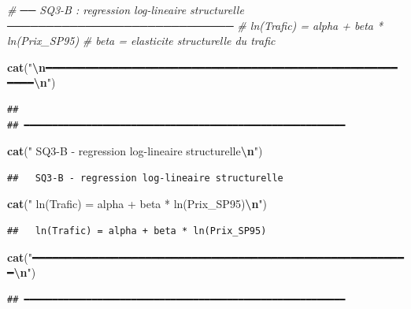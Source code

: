 \documentclass[
]{article}
\newenvironment{Shaded}{\begin{snugshade}}{\end{snugshade}}
\newcommand{\CommentTok}[1]{\textcolor[rgb]{0.56,0.35,0.01}{\textit{#1}}}
\newcommand{\FunctionTok}[1]{\textcolor[rgb]{0.13,0.29,0.53}{\textbf{#1}}}
\newcommand{\NormalTok}[1]{#1}
\newcommand{\SpecialCharTok}[1]{\textcolor[rgb]{0.81,0.36,0.00}{\textbf{#1}}}
\newcommand{\StringTok}[1]{\textcolor[rgb]{0.31,0.60,0.02}{#1}}
\begin{document}
\begin{Shaded}
\begin{Highlighting}[]
\CommentTok{\# ── SQ3{-}B : regression log{-}lineaire structurelle ─────────────────────────────}
\CommentTok{\# ln(Trafic) = alpha + beta * ln(Prix\_SP95)}
\CommentTok{\# beta = elasticite structurelle du trafic}

\FunctionTok{cat}\NormalTok{(}\StringTok{"}\SpecialCharTok{\textbackslash{}n}\StringTok{━━━━━━━━━━━━━━━━━━━━━━━━━━━━━━━━━━━━━━━━━━━━━━━━━━━━━━━━━}\SpecialCharTok{\textbackslash{}n}\StringTok{"}\NormalTok{)}
\end{Highlighting}
\end{Shaded}

\begin{verbatim}
## 
## ━━━━━━━━━━━━━━━━━━━━━━━━━━━━━━━━━━━━━━━━━━━━━━━━━━━━━━━━━
\end{verbatim}

\begin{Shaded}
\begin{Highlighting}[]
\FunctionTok{cat}\NormalTok{(}\StringTok{"  SQ3{-}B {-} regression log{-}lineaire structurelle}\SpecialCharTok{\textbackslash{}n}\StringTok{"}\NormalTok{)}
\end{Highlighting}
\end{Shaded}

\begin{verbatim}
##   SQ3-B - regression log-lineaire structurelle
\end{verbatim}

\begin{Shaded}
\begin{Highlighting}[]
\FunctionTok{cat}\NormalTok{(}\StringTok{"  ln(Trafic) = alpha + beta * ln(Prix\_SP95)}\SpecialCharTok{\textbackslash{}n}\StringTok{"}\NormalTok{)}
\end{Highlighting}
\end{Shaded}

\begin{verbatim}
##   ln(Trafic) = alpha + beta * ln(Prix_SP95)
\end{verbatim}

\begin{Shaded}
\begin{Highlighting}[]
\FunctionTok{cat}\NormalTok{(}\StringTok{"━━━━━━━━━━━━━━━━━━━━━━━━━━━━━━━━━━━━━━━━━━━━━━━━━━━━━━━━━}\SpecialCharTok{\textbackslash{}n}\StringTok{"}\NormalTok{)}
\end{Highlighting}
\end{Shaded}

\begin{verbatim}
## ━━━━━━━━━━━━━━━━━━━━━━━━━━━━━━━━━━━━━━━━━━━━━━━━━━━━━━━━━
\end{verbatim}
\end{document}
